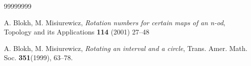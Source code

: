 \documentclass[12pt,reqno]{amsart}
\theoremstyle{definition}
\theoremstyle{remark}
\theoremstyle{assumption}
\numberwithin{equation}{section}
\begin{document}
\begin{thebibliography}{99999999}
	
	
	
	
	 A. Blokh, M. Misiurewicz, \emph{Rotation numbers for certain maps of an n-od}, Topology and its Applications
	\textbf{114} (2001) 27–48
	
	 A. Blokh, M. Misiurewicz, \emph{Rotating an interval
		and a circle}, Trans. Amer. Math. Soc. \textbf{351}(1999), 63--78.

	
	
	
	
	
	
	
	
	
	
	

\end{thebibliography}
\end{document}
